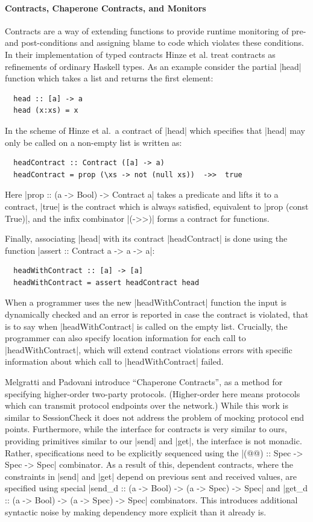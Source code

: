\documentclass{article}
\begin{document}
\paragraph{Contracts, Chaperone Contracts, and Monitors}
%
Contracts \cite{Contracts} are a way of extending functions to provide runtime
monitoring of pre- and post-conditions and assigning blame to code which
violates these conditions.
%
In their implementation of typed contracts Hinze et al. \cite{ContractsHinze}
treat contracts as refinements of ordinary Haskell types.
%
As an example consider the partial |head| function which takes a list and
returns the first element:
%
\begin{verbatim}
  head :: [a] -> a
  head (x:xs) = x
\end{verbatim}
%
In the scheme of Hinze et al.\ a contract of |head| which specifies that |head|
may only be called on a non-empty list is written as:
%
\begin{verbatim}
  headContract :: Contract ([a] -> a)
  headContract = prop (\xs -> not (null xs))  ->>  true
\end{verbatim}
%
Here |prop :: (a -> Bool) -> Contract a| takes a predicate and lifts
it to a contract, |true| is the contract which is always satisfied,
equivalent to |prop (const True)|, and the infix combinator |(->>)|
forms a contract for functions.

%
Finally, associating |head| with its contract |headContract| is done
using the function |assert :: Contract a -> a -> a|:
%
\begin{verbatim}
  headWithContract :: [a] -> [a]
  headWithContract = assert headContract head
\end{verbatim}
%
When a programmer uses the new |headWithContract| function the input is
dynamically checked and an error is reported in case the contract is violated,
that is to say when |headWithContract| is called on the empty list.
%
Crucially, the programmer can also specify location information for each call to
|headWithContract|, which will extend contract violations errors with specific
information about which call to |headWithContract| failed.

Melgratti and Padovani \cite{ChaperoneContracts} introduce ``Chaperone
Contracts'', as a method for specifying higher-order two-party
protocols. (Higher-order here means protocols which can transmit
protocol endpoints over the network.)
%
While this work is similar to SessionCheck it does not address the problem
of mocking protocol end points.
%
Furthermore, while the interface for contracts is very similar to ours,
providing primitives similar to our |send| and |get|, the interface is not
monadic.
%
Rather, specifications need to be explicitly sequenced using the
|(@@) :: Spec -> Spec -> Spec| combinator.
%
As a result of this, dependent contracts, where the constraints in |send| and
|get| depend on previous sent and received values, are specified using
special |send_d :: (a -> Bool) -> (a -> Spec) -> Spec| and
|get_d :: (a -> Bool) -> (a -> Spec) -> Spec| combinators.
%
This introduces additional syntactic noise by making dependency more
explicit than it already is.
\end{document}
